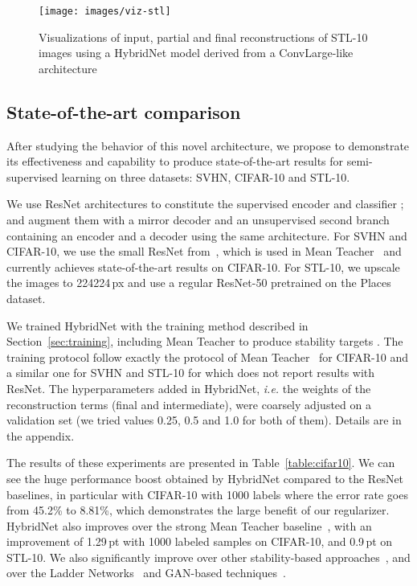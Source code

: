 \documentclass[runningheads]{llncs}
\begin{document}
\begin{figure}[tb]
	\centering
	\texttt{[image: images/viz-stl]}
    \caption{Visualizations of input, partial and final reconstructions of STL-10 images using a HybridNet model derived from a ConvLarge-like architecture}
    \label{fig:viz-stl}
\end{figure}

\subsection{State-of-the-art comparison}
\label{sec:cifar10sota}

After studying the behavior of this novel architecture, we propose to demonstrate its effectiveness and capability to produce state-of-the-art results for semi-supervised learning on three datasets: SVHN, CIFAR-10 and STL-10.

We use ResNet architectures to constitute the supervised encoder  and classifier ; and augment them with a mirror decoder  and an unsupervised second branch containing an encoder  and a decoder  using the same architecture. For SVHN and CIFAR-10, we use the small ResNet from~\cite{Gastaldi2017}, which is used in Mean Teacher~\cite{Tarvainen2017} and currently achieves state-of-the-art results on CIFAR-10. For STL-10, we upscale the images to 224224\,px and use a regular ResNet-50 pretrained on the Places dataset.

We trained HybridNet with the training method described in Section~\ref{sec:training}, including Mean Teacher to produce stability targets . The training protocol follow exactly the protocol of Mean Teacher~\cite{Tarvainen2017} for CIFAR-10 and a similar one for SVHN and STL-10 for which \cite{Tarvainen2017} does not report results with ResNet. The hyperparameters added in HybridNet, \textit{i.e.} the weights of the reconstruction terms (final and intermediate), were coarsely adjusted on a validation set (we tried values 0.25, 0.5 and 1.0 for both of them). Details are in the appendix.

The results of these experiments are presented in Table~\ref{table:cifar10}.
We can see the huge performance boost obtained by HybridNet compared to the ResNet baselines, in particular with CIFAR-10 with 1000 labels where the error rate goes from 45.2\% to 8.81\%, which demonstrates the large benefit of our regularizer. HybridNet also improves over the strong Mean Teacher baseline~\cite{Tarvainen2017}, with an improvement of 1.29\,pt with 1000 labeled samples on CIFAR-10, and 0.9\,pt on STL-10. We also significantly improve over other stability-based approaches~\cite{Sajjadi2016,Laine2016}, and over the Ladder Networks~\cite{Rasmus2015} and GAN-based techniques~\cite{Springenberg2015,Salimans2016}.
\end{document}

